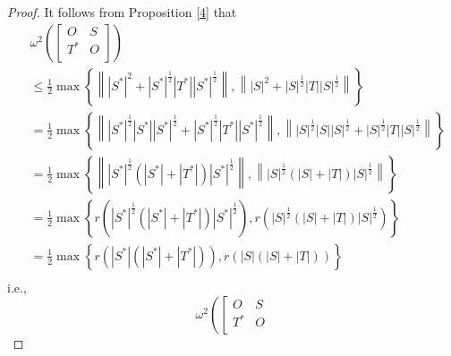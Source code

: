 \documentclass[12pt,twoside,reqno]{amsart}
\numberwithin{equation}{section}
\begin{document}
\begin{proof}
It follows from Proposition \ref{4} that
\[\begin{aligned}
  & {{\omega }^{2}}\left( \left[ \begin{matrix}
   O & S  \\
   {{T}^{*}} & O  \\
\end{matrix} \right] \right) \\ 
 & \le \frac{1}{2}\max \left\{ \left\| {{\left| {{S}^{*}} \right|}^{2}}+{{\left| {{S}^{*}} \right|}^{\frac{1}{2}}}\left| {{T}^{*}} \right|{{\left| {{S}^{*}} \right|}^{\frac{1}{2}}} \right\|,\left\| {{\left| S \right|}^{2}}+{{\left| S \right|}^{\frac{1}{2}}}\left| T \right|{{\left| S \right|}^{\frac{1}{2}}} \right\| \right\} \\ 
 & =\frac{1}{2}\max \left\{ \left\| {{\left| {{S}^{*}} \right|}^{\frac{1}{2}}}\left| {{S}^{*}} \right|{{\left| {{S}^{*}} \right|}^{\frac{1}{2}}}+{{\left| {{S}^{*}} \right|}^{\frac{1}{2}}}\left| {{T}^{*}} \right|{{\left| {{S}^{*}} \right|}^{\frac{1}{2}}} \right\|,\left\| {{\left| S \right|}^{\frac{1}{2}}}\left| S \right|{{\left| S \right|}^{\frac{1}{2}}}+{{\left| S \right|}^{\frac{1}{2}}}\left| T \right|{{\left| S \right|}^{\frac{1}{2}}} \right\| \right\} \\ 
 & =\frac{1}{2}\max \left\{ \left\| {{\left| {{S}^{*}} \right|}^{\frac{1}{2}}}\left( \left| {{S}^{*}} \right|+\left| {{T}^{*}} \right| \right){{\left| {{S}^{*}} \right|}^{\frac{1}{2}}} \right\|,\left\| {{\left| S \right|}^{\frac{1}{2}}}\left( \left| S \right|+\left| T \right| \right){{\left| S \right|}^{\frac{1}{2}}} \right\| \right\} \\ 
 & =\frac{1}{2}\max \left\{ r\left( {{\left| {{S}^{*}} \right|}^{\frac{1}{2}}}\left( \left| {{S}^{*}} \right|+\left| {{T}^{*}} \right| \right){{\left| {{S}^{*}} \right|}^{\frac{1}{2}}} \right),r\left( {{\left| S \right|}^{\frac{1}{2}}}\left( \left| S \right|+\left| T \right| \right){{\left| S \right|}^{\frac{1}{2}}} \right) \right\} \\ 
 & =\frac{1}{2}\max \left\{ r\left( \left| {{S}^{*}} \right|\left( \left| {{S}^{*}} \right|+\left| {{T}^{*}} \right| \right) \right),r\left( \left| S \right|\left( \left| S \right|+\left| T \right| \right) \right) \right\} \\ 
\end{aligned}\]
i.e.,
\[{{\omega }^{2}}\left( \left[ \begin{matrix}
   O & S  \\
   {{T}^{*}} & O  \\

\end{matrix}\]
\end{proof}
\end{document}
